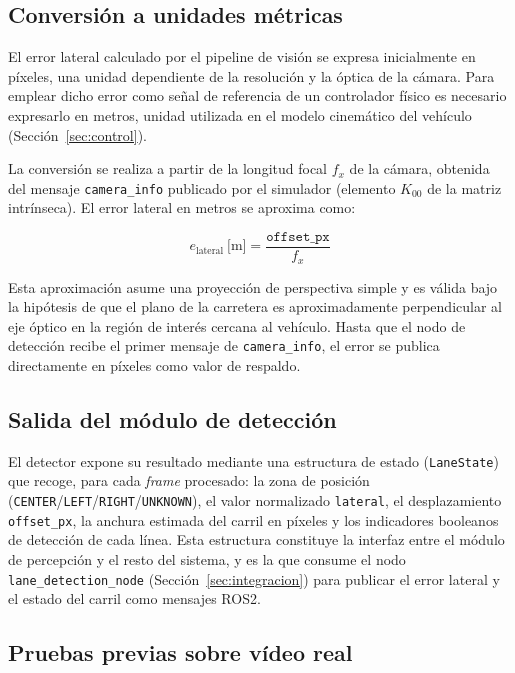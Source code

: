 \documentclass[12pt, a4paper]{article}
\begin{document}
\subsection{Conversión a unidades métricas}

El error lateral calculado por el pipeline de visión se expresa inicialmente en píxeles, una unidad dependiente de la resolución y la óptica de la cámara. Para emplear dicho error como señal de referencia de un controlador físico es necesario expresarlo en metros, unidad utilizada en el modelo cinemático del vehículo (Sección~\ref{sec:control}).

La conversión se realiza a partir de la longitud focal $f_x$ de la cámara, obtenida del mensaje \texttt{camera\_info} publicado por el simulador (elemento $K_{00}$ de la matriz intrínseca). El error lateral en metros se aproxima como:

\begin{equation}
	e_{\text{lateral}}~\text{[m]} = \frac{\texttt{offset\_px}}{f_x}
\end{equation}

Esta aproximación asume una proyección de perspectiva simple y es válida bajo la hipótesis de que el plano de la carretera es aproximadamente perpendicular al eje óptico en la región de interés cercana al vehículo. Hasta que el nodo de detección recibe el primer mensaje de \texttt{camera\_info}, el error se publica directamente en píxeles como valor de respaldo.

\subsection{Salida del módulo de detección}

El detector expone su resultado mediante una estructura de estado (\texttt{LaneState}) que recoge, para cada \textit{frame} procesado: la zona de posición (\texttt{CENTER}/\texttt{LEFT}/\texttt{RIGHT}/\texttt{UNKNOWN}), el valor normalizado \texttt{lateral}, el desplazamiento \texttt{offset\_px}, la anchura estimada del carril en píxeles y los indicadores booleanos de detección de cada línea. Esta estructura constituye la interfaz entre el módulo de percepción y el resto del sistema, y es la que consume el nodo \texttt{lane\_detection\_node} (Sección~\ref{sec:integracion}) para publicar el error lateral y el estado del carril como mensajes ROS2.

\subsection{Pruebas previas sobre vídeo real}
\end{document}
